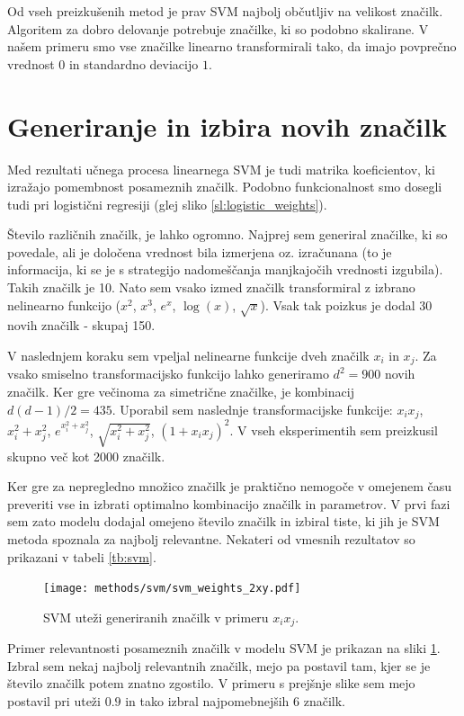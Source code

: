 \documentclass[11pt,a4paper,openany]{book}
\begin{document}
Od vseh preizkušenih metod je prav SVM najbolj občutljiv na velikost značilk. Algoritem za dobro delovanje potrebuje značilke, ki so podobno skalirane. V našem primeru smo vse značilke linearno transformirali tako, da imajo povprečno vrednost $0$ in standardno deviacijo $1$.


\section{Generiranje in izbira novih značilk}
Med rezultati učnega procesa linearnega SVM je tudi matrika koeficientov, ki izražajo pomembnost posameznih značilk. Podobno funkcionalnost smo dosegli tudi pri logistični regresiji (glej sliko \ref{sl:logistic_weights}).

Število različnih značilk, je lahko ogromno. Najprej sem generiral značilke, ki so povedale, ali je določena vrednost bila izmerjena oz. izračunana (to je informacija, ki se je s strategijo nadomeščanja manjkajočih vrednosti izgubila). Takih značilk je 10. Nato sem vsako izmed značilk transformiral z izbrano nelinearno funkcijo ($x^2$, $x^3$, $e^{x}$, $\log(x)$, $\sqrt{x}$). Vsak tak poizkus je dodal 30 novih značilk - skupaj 150.

V naslednjem koraku sem vpeljal nelinearne funkcije dveh značilk $x_i$ in $x_j$. Za vsako smiselno transformacijsko funkcijo lahko generiramo $d^2 = 900$ novih značilk. Ker gre večinoma za simetrične značilke, je kombinacij $d(d-1)/2 = 435$. Uporabil sem naslednje transformacijske funkcije: $x_ix_j$, $x_i^2 + x_j^2$, $e^{x_i^2 + x_j^2}$, $\sqrt{x_i^2 + x_j^2}$, $(1 + x_ix_j)^2$. V vseh eksperimentih sem preizkusil skupno več kot 2000 značilk.

Ker gre za nepregledno množico značilk je praktično nemogoče v omejenem času preveriti vse in izbrati optimalno kombinacijo značilk in parametrov. V prvi fazi sem zato modelu dodajal omejeno število značilk in izbiral tiste, ki jih je SVM metoda spoznala za najbolj relevantne. Nekateri od vmesnih rezultatov so prikazani v tabeli \ref{tb:svm}.

\begin{figure}[h]
	\centering	
	\texttt{[image: methods/svm/svm\_weights\_2xy.pdf]}
	
	\caption{SVM uteži generiranih značilk v primeru $x_ix_j$.}
	\label{sl:svm_xy_weights}
\end{figure}

Primer relevantnosti posameznih značilk v modelu SVM je prikazan na sliki \ref{sl:svm_xy_weights}. Izbral sem nekaj najbolj relevantnih značilk, mejo pa postavil tam, kjer se je število značilk potem znatno zgostilo. V primeru s prejšnje slike sem mejo postavil pri uteži $\num{0,9}$ in tako izbral najpomebnejših 6 značilk.
\end{document}
